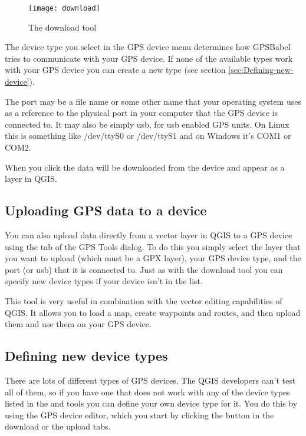 \begin{figure}[ht]
   \begin{center}
\caption{\label{figure_download}The download tool \nixcaption}
\texttt{[image: download]}
   \end{center}
\end{figure}

The device type you select in the GPS device menu determines how GPSBabel tries to communicate with your GPS device.
If none of the available types work with your GPS device you can create a new type (see section \ref{sec:Defining-new-device}).

The port may be a file name or some other name that your operating system uses as a reference to the physical port in your computer that the GPS device is connected to. It may also be simply usb, for usb enabled GPS units.
\nix On Linux this is something like /dev/ttyS0 or /dev/ttyS1 and on \win Windows it's COM1 or COM2.

When you click  the data will be downloaded from the device and appear as a layer in QGIS.

\subsection{Uploading GPS data to a device}

You can also upload data directly from a vector layer in QGIS to a GPS device using the  tab of the GPS Tools dialog. To do this you simply select the layer that you want to upload (which must be a GPX layer), 
your GPS device type, and the port (or usb) that it is connected to.
Just as with the download tool you can specify new device types if your device isn't in the list.

This tool is very useful in combination with the vector editing capabilities of QGIS. It allows you to load a map, create waypoints and routes, and then upload them and use them on your GPS device.

\subsection{\label{sec:Defining-new-device}Defining new device types}

There are lots of different types of GPS devices.
The QGIS developers can't test all of them, so if you have one that does not work with any of the device types listed in the  and  tools you can define your own device type for it.
You do this by using the GPS device editor, which you start by clicking the  button in the download or the upload tabs.


